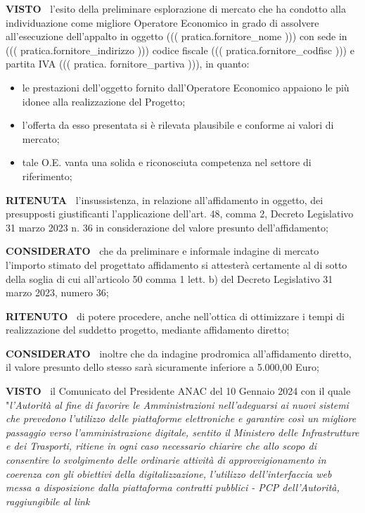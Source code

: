 \textbf{VISTO~} l'esito della preliminare
esplorazione di mercato che ha condotto alla individuazione come migliore
Operatore Economico in grado di assolvere all'esecuzione dell'appalto
in oggetto ((( pratica.fornitore_nome ))) con sede in ((( pratica.fornitore_indirizzo )))
codice fiscale ((( pratica.fornitore_codfisc ))) e partita IVA ((( pratica. fornitore_partiva ))),
in quanto:

\begin{itemize}
\item  le prestazioni dell'oggetto fornito dall'Operatore Economico
appaiono le più idonee alla realizzazione del Progetto;

\item 
l'offerta da esso presentata si è rilevata plausibile e conforme
ai valori di mercato;

\item tale O.E. vanta una solida e riconosciuta
competenza nel settore di riferimento;

\end{itemize}

\textbf{RITENUTA~}  l'insussistenza, in relazione
all'affidamento in oggetto, dei presupposti giustificanti
l'applicazione dell'art. 48, comma 2, Decreto Legislativo 31 marzo
2023 n. 36  in considerazione del valore presunto dell'affidamento; 

\textbf{CONSIDERATO~} che da preliminare e informale indagine
di mercato l'importo stimato del progettato affidamento si attesterà
certamente al di sotto della soglia di cui all'articolo 50 comma 1
lett. b) del Decreto Legislativo 31 marzo 2023, numero 36;

\textbf{RITENUTO~} di potere procedere, anche nell'ottica di
ottimizzare i tempi di realizzazione del suddetto progetto, mediante
affidamento diretto;

\textbf{CONSIDERATO~}  inoltre che da indagine prodromica
all'affidamento diretto, il valore presunto dello stesso sarà
sicuramente inferiore a 5.000,00 Euro;

\textbf{VISTO~} il Comunicato del Presidente ANAC
del 10 Gennaio 2024 con il quale "\textit{l'Autorità al fine di favorire
le Amministrazioni nell'adeguarsi ai nuovi sistemi che prevedono
l'utilizzo delle piattaforme elettroniche e garantire così un migliore
passaggio verso l'amministrazione digitale, sentito il Ministero
delle Infrastrutture e dei Trasporti, ritiene in ogni caso necessario
chiarire che allo scopo di consentire lo svolgimento delle ordinarie
attività di approvvigionamento in coerenza con gli obiettivi della
digitalizzazione, l'utilizzo dell'interfaccia web messa a disposizione
dalla piattaforma contratti pubblici - PCP dell'Autorità, raggiungibile
al link} 

